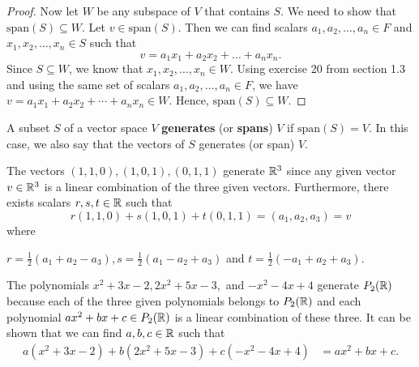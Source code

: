 \begin{proof}
Now let \( W  \) be any subspace of \( V  \) that contains \( S  \).  We need to show that \( \text{span}(S) \subseteq W  \). Let \( v \in \text{span}(S) \). Then we can find scalars \( a_{1}, a_{2}, \dots, a_{n} \in F    \) and \( x_{1} , x_{2} , \dots, x_{n} \in S  \) such that 
\[  v = a_{1} x_{1} + a_{2} x_{2} + \dots + a_{n} x_{n}.   \]
Since \( S \subseteq W  \), we know that \( x_{1}, x_{2} , \dots , x_{n} \in W  \). Using exercise 20 from section 1.3 and using the same set of scalars \( a_{1}, a_{2}, \dots, a_{n} \in F  \), we have \( v = a_{1} x_{1} + a_{2} x_{2} + \cdots + a_{n} x_{n} \in W  \). Hence, \( \text{span}(S) \subseteq W  \).
\end{proof}

\begin{definition}[ ]
    A subset \( S  \) of a vector space \( V  \) \textbf{generates} (or \textbf{spans}) \( V  \) if \( \text{span}(S) = V  \). In this case, we also say that the vectors of \( S  \) generates (or span) \( V  \).
\end{definition}

\begin{eg}[Vectors in \( \R^3 \)]
    The vectors \( (1,1,0) , (1,0,1) , (0,1,1)   \) generate \( \mathbb{R}^{3} \) since any given vector \( v \in \mathbb{R}^{3}  \) is a linear combination of the three given vectors. Furthermore, there exists scalars \( r,s,t \in \mathbb{R} \) such that
    \[  r(1,1,0) + s(1,0,1) + t(0,1,1) = (a_{1}, a_{2} , a_{3}) = v \]
    where
    \begin{center}
       \( r = \frac{ 1 }{ 2 }  (a_{1} + a_{2} - a_{3}), s = \frac{ 1 }{ 2 }   (a_{1} - a_{2} + a_{3}) \) and \( t = \frac{ 1 }{ 2 }  (-a_{1} + a_{2} + a_{3}) \). 
    \end{center}
\end{eg}

\begin{eg}[Polynomials]
   The polynomials \( x^{2} + 3x - 2, 2x^{2} + 5x - 3,   \) and \( -x^{2} - 4x + 4  \) generate \( P_{2}(\mathbb{R} ) \) because each of the three given polynomials belongs to \( P_{2}(\mathbb{R}) \) and each polynomial \( ax^{2} + bx + c \in P_{2}(\mathbb{R}) \) is a linear combination of these three. It can be shown that we can find \( a,b,c   \in \mathbb{R}  \) such that 
   \begin{align*}
   a (x^{2} + 3x - 2)   + b (2x^{2} + 5x - 3) +  c (-x^{2} - 4x + 4) &= ax^{2} + bx + c.   
\end{align*}
\end{eg}

